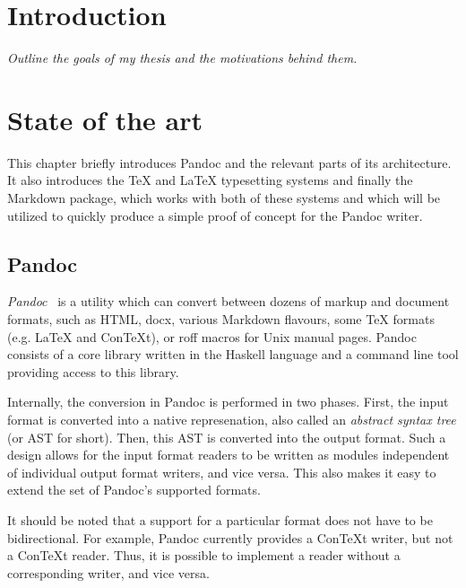\documentclass[
  digital,     %
  oneside,     %
  nosansbold,  %
  nocolorbold, %
  lof,         %
  lot,         %
]{fithesis4}
\begin{document}

\chapter{Introduction}
\emph{Outline the goals of my thesis and the motivations behind them.}

\chapter{State of the art}
This chapter briefly introduces Pandoc and the relevant parts of its architecture. It also introduces the \TeX{} and \LaTeX{} typesetting systems and finally the Markdown package, which works with both of these systems and which will be utilized to quickly produce a simple proof of concept for the Pandoc writer.

\section{Pandoc}
\emph{Pandoc}~\cite{pandoc} is a utility which can convert between dozens of markup and document formats, such as HTML, docx, various Markdown flavours, some \TeX{} formats (e.g. \LaTeX{} and Con\TeX{}t), or roff macros for Unix manual pages. Pandoc consists of a core library written in the Haskell language and a command line tool providing access to this library.

Internally, the conversion in Pandoc is performed in two phases. First, the input format is converted into a native represenation, also called an \emph{abstract syntax tree} (or AST for short). Then, this AST is converted into the output format. Such a design allows for the input format readers to be written as modules independent of individual output format writers, and vice versa. This also makes it easy to extend the set of Pandoc's supported formats.

It should be noted that a support for a particular format does not have to be bidirectional. For example, Pandoc currently provides a Con\TeX{}t writer, but not a Con\TeX{}t reader. Thus, it is possible to implement a reader without a corresponding writer, and vice versa.
\end{document}
